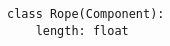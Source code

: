 \par\begin{minipage}{60ex}
\begin{verbatim}
class Rope(Component):
    length: float
\end{verbatim}
\end{minipage}\par